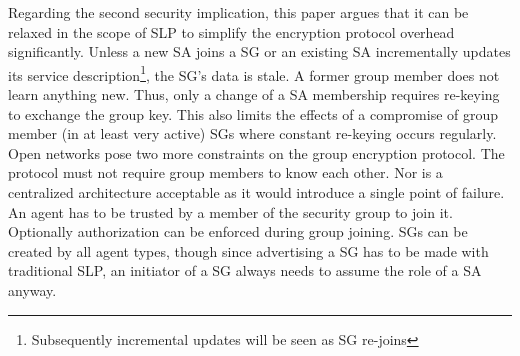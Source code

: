 Regarding the second security implication, this paper argues that it can be relaxed in the scope of SLP to simplify the encryption protocol overhead significantly. Unless a new SA joins a SG or an existing SA incrementally updates its service description\footnote{Subsequently incremental updates will be seen as SG re-joins}, the SG's data is stale. A former group member does not learn anything new. Thus, only a change of a SA membership requires re-keying to exchange the group key. This also limits the effects of a compromise of group member (in at least very active) SGs where constant re-keying occurs regularly.\\
Open networks pose two more constraints on the group encryption protocol. The protocol must not require group members to know each other. Nor is a centralized architecture acceptable as it would introduce a single point of failure.\\
An agent has to be trusted by a member of the security group to join it. Optionally authorization can be enforced during group joining. SGs can be created by all agent types, though since advertising a SG has to be made with traditional SLP, an initiator of a SG always needs to assume the role of a SA anyway.

